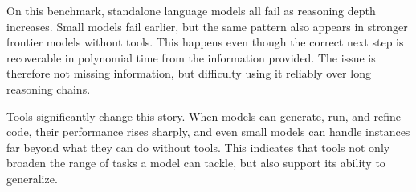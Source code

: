 \documentclass{article}
\begin{document}



On this benchmark, standalone language models all fail as reasoning depth increases. Small models fail earlier, but the same pattern also appears in stronger frontier models without tools. This happens even though the correct next step is recoverable in polynomial time from the information provided. The issue is therefore not missing information, but difficulty using it reliably over long reasoning chains.

Tools significantly change this story. When models can generate, run, and refine code, their performance rises sharply, and even small models can handle instances far beyond what they can do without tools. This indicates that tools not only broaden the range of tasks a model can tackle, but also support its ability to generalize.
\end{document}
